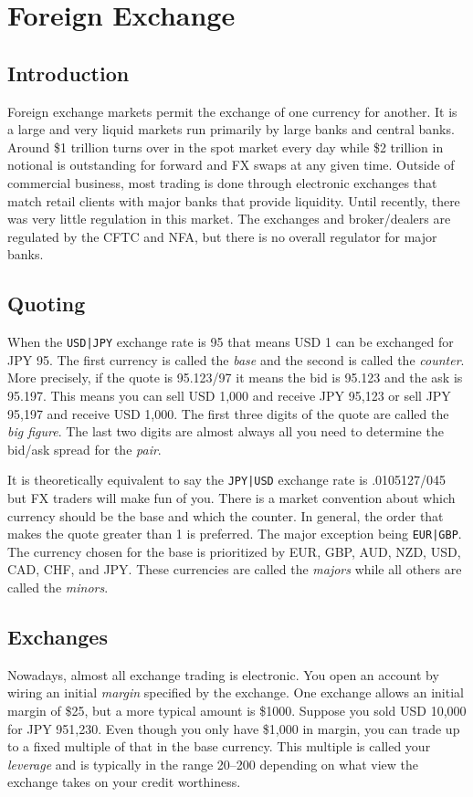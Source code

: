 \chapter{Foreign Exchange}

\section{Introduction}
Foreign exchange markets permit the exchange of one currency for
another. It is a large and very liquid markets run primarily by large
banks and central banks.  Around \$1 trillion turns over in the spot
market every day while \$2 trillion in notional is outstanding for forward
and FX swaps at any given time.  Outside of commercial business, most
trading is done through electronic exchanges that match retail clients
with major banks that provide liquidity.  Until recently, there was very
little regulation in this market.  The exchanges and broker/dealers are
regulated by the CFTC and NFA, but there is no overall regulator for
major banks.

\section{Quoting}
When the {\tt USD|JPY} exchange rate is 95 that means USD 1 can
be exchanged for JPY 95. The first currency is called
the {\em base} and the second is called the {\em counter}.
More precisely, if the quote
is 95.123/97 it means the bid is 95.123 and the ask is 95.197.
This means you can sell USD 1,000 and receive JPY 95,123
or sell JPY 95,197 and receive USD 1,000. The first three
digits of the quote are called the {\em big figure}. The last
two digits are almost always all you need to determine the
bid/ask spread for the {\em pair}.

It is theoretically equivalent to say the {\tt JPY|USD} exchange
rate is .0105127/045 but FX traders will make fun of you.  There is a
market convention about which currency should be the base and which the
counter. In general, the order that makes the quote greater than 1 is
preferred. The major exception being {\tt EUR|GBP}. The currency chosen
for the base is prioritized by EUR, GBP, AUD, NZD, USD, CAD, CHF, and JPY.
These currencies are called the {\em majors} while all others are called
the {\em minors}.

\section{Exchanges}
Nowadays, almost all exchange trading is electronic. You open an account
by wiring an initial {\em margin} specified by the exchange. One exchange
allows an initial margin of \$25, but a more typical amount is \$1000.
Suppose you sold USD 10,000 for JPY 951,230. Even though you only
have \$1,000 in margin, you can trade up to a fixed multiple of that
in the base currency. This multiple is called your {\em leverage} and
is typically in the range 20--200 depending on what view the
exchange takes on your credit worthiness.

